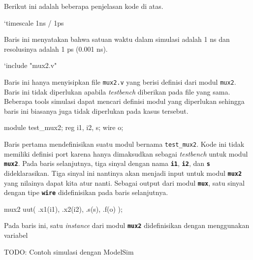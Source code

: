 Berikut ini adalah beberapa penjelasan kode di atas.

\begin{verilogcode}
`timescale 1ns / 1ps
\end{verilogcode}
Baris ini menyatakan bahwa satuan waktu dalam simulasi adalah 1 ns dan
resolusinya adalah 1 ps (0.001 ns).

\begin{verilogcode}
`include "mux2.v"
\end{verilogcode}
Baris ini hanya menyisipkan file {\tt mux2.v} yang berisi definisi dari modul {\tt mux2}.
Baris ini tidak diperlukan apabila \textit{testbench} diberikan pada file yang sama.
Beberapa tools simulasi dapat mencari definisi modul yang diperlukan sehingga
baris ini biasanya juga tidak diperlukan pada kasus tersebut.

\begin{verilogcode}
module test_mux2;
  reg i1, i2, s;
  wire o;
\end{verilogcode}

Baris pertama mendefinisikan suatu modul bernama {\tt\small test\_mux2}. Kode
ini tidak memiliki definisi port karena hanya dimaksudkan sebagai {\it testbench}
untuk modul {\tt\textbf{mux2}}. Pada baris selanjutnya,
tiga sinyal dengan nama {\tt\textbf{i1}}, {\tt\textbf{i2}},
dan {\tt\textbf{s}} dideklarasikan. Tiga sinyal ini nantinya akan menjadi input untuk
modul {\tt\textbf{mux2}}
yang nilainya dapat kita atur nanti.
Sebagai output dari modul {\tt\textbf{mux}}, satu sinyal dengan tipe {\tt\textbf{wire}}
didefinisikan pada baris selanjutnya.

\begin{verilogcode}
  mux2 uut( .x1(i1), .x2(i2), .s(s), .f(o) );
\end{verilogcode}

Pada baris ini, satu \textit{instance} dari modul {\tt\textbf{mux2}} didefinisikan
dengan menggunakan variabel

{\color{red} TODO: Contoh simulasi dengan ModelSim}
